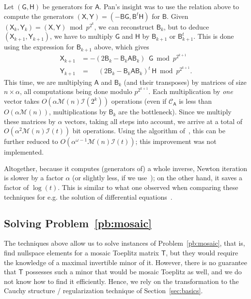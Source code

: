 \documentclass[sigconf]{acmart}
\newcommand{\mA}{\ensuremath{\mathsf{A}}}
\newcommand{\mB}{\ensuremath{\mathsf{B}}}
\newcommand{\mG}{\ensuremath{\mathsf{G}}}
\newcommand{\mH}{\ensuremath{\mathsf{H}}}
\newcommand{\mT}{\ensuremath{\mathsf{T}}}
\newcommand{\mX}{\ensuremath{\mathsf{X}}}
\newcommand{\mY}{\ensuremath{\mathsf{Y}}}
\newcommand{\M}{\ensuremath{\mathscr{M}}}
\newcommand{\I}{\ensuremath{\mathscr{I}}}
\newcommand{\CA}{\ensuremath{\mathscr{C}_\mA}}
\theoremstyle{acmdefinition}
\begin{document}
Let $(\mG,\mH)$ be generators for $\mA$. Pan's insight was to use the
relation above to compute the generators $(\mX,\mY)=(-\mB
\mG,\mB^{t}\mH)$ for $\mB$. Given $(\mX_k,\mY_k)=(\mX,\mY) \bmod
p^{2^k}$, we can reconstruct $\mB_k$, but to deduce
$(\mX_{k+1},\mY_{k+1})$, we have to multiply $\mG$ and $\mH$ by
$\mB_{k+1}$ or $\mB_{k+1}^t$. This is done using the expression for
$\mB_{k+1}$ above, which gives
\begin{align*}
\mX_{k+1} &= -(2\mB_k - \mB_k \mA \mB_k)\phantom{^t\,} \mG \bmod p^{2^{k+1}}\\
\mY_{k+1} &= \phantom{-}(2\mB_k - \mB_k \mA \mB_k)^t\, \mH \bmod p^{2^{k+1}}.
\end{align*}
This time, we are multiplying $\mA$ and $\mB_k$ (and their transposes)
by matrices of size $n \times \alpha$, all computations being done
modulo $p^{2^{k+1}}$. Each multiplication by {\em one} vector takes
$O(\alpha \M(n) \I(2^k))$ operations (even if $\CA$ is less
than $O(\alpha \M(n))$, multiplications by $\mB_k$ are the
bottleneck). Since we  multiply these matrices by $\alpha$
vectors, taking all steps into account, we arrive at a total of
$O(\alpha^2 \M(n) \I(t))$ bit operations. Using the algorithm
of~\cite{BoJeMoSc16}, this can be further reduced to
$O(\alpha^{\omega-1} \M(n) \I(t))$; this improvement was not
implemented.

Altogether, because it computes (generators of) a whole inverse,
Newton iteration is slower by a factor $\alpha$ (or slightly less, if
we use~\cite{BoJeMoSc16}); on the other hand, it saves a factor of
$\log(t)$. This is similar to what one observed when comparing these
techniques for e.g. the solution of differential
equations~\cite{BoChOlSaScSc07,BoChLeSaSc12}.


\vspace{-5px}
\subsection{Solving Problem~\ref{pb:mosaic}}\label{ssec:liftQ}

The techniques above allow us to solve instances of
Problem~\ref{pb:mosaic}, that is, find nullspace elements for a
mosaic Toeplitz matrix $\mT$, but they would require the knowledge of
a maximal invertible minor of it. However, there is no guarantee that
$\mT$ possesses such a minor that would be mosaic Toeplitz as well,
and we do not know how to find it efficiently. Hence, we rely on the
transformation to the Cauchy structure / regularization technique
of Section~\ref{sec:basics}.
\end{document}
